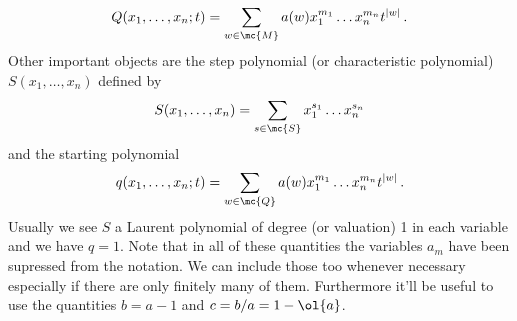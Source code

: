 \begin{align}
	Q(x_1,\ldots,x_n;t) = \sum_{w \in \mc{M}} a(w) x_1^{m_1}\ldots x_n^{m_n} t^{|w|}\,.
\end{align}
Other important objects are the step polynomial (or characteristic polynomial) $S(x_1,\ldots,x_n)$ defined by
\begin{align}
	S(x_1,\ldots,x_n) = \sum_{s \in \mc{S}} x_1^{s_1}\ldots x_n^{s_n}
\end{align}
and the starting polynomial
\begin{align}
	q(x_1,\ldots,x_n;t) = \sum_{w \in \mc{Q}}  a(w) x_1^{m_1}\ldots x_n^{m_n} t^{|w|}\,.
\end{align}
Usually we see $S$ a Laurent polynomial of degree (or valuation) 1 in each variable and we have $q = 1$. Note that in all of these quantities the variables $a_m$ have been supressed from the notation. We can include those too whenever necessary especially if there are only finitely many of them. Furthermore it'll be useful to use the quantities $b = a - 1$ and $c = b/a = 1- \ol{a}$.
